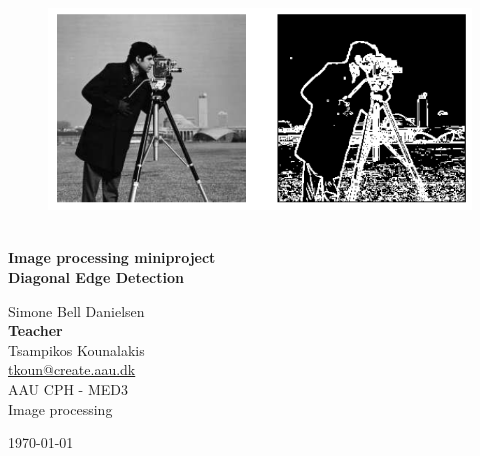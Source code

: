 \begin{titlepage}
			
\addtolength{\voffset}{2cm}

\begin{figure}[H]
\centering
\vspace{2cm}	%
\includegraphics[width=0.99\linewidth]{figure/Frontpage/camera.png}
\end{figure}

\mbox{}
\vfill
\renewcommand{\familydefault}{\sfdefault} \normalfont %
\HRule\\[0.2cm]
\textbf{{\small Image processing miniproject\\ \Huge  Diagonal Edge Detection}}\\
\HRule\medskip{}
\begin{multicols}{2}
{\Large Simone Bell Danielsen\columnbreak}\\
\setlength{\parskip}{2.4cm}
\Large{\textbf{Teacher}\\Tsampikos Kounalakis\\\href{mailto:tkoun@create.aau.dk }{tkoun@create.aau.dk}}
\\\small AAU CPH - 
MED3 \\
Image processing\\
\end{multicols}
\today
\renewcommand{\familydefault}{\rmdefault} \normalfont %
\end{titlepage}



